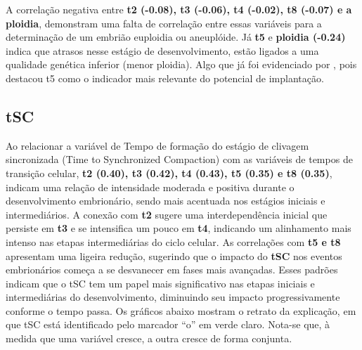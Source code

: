 A correlação negativa entre \textbf{t2 (-0.08), t3 (-0.06), t4 (-0.02), t8 (-0.07) e a ploidia}, demonstram uma falta de correlação entre essas variáveis para a determinação de um embrião euploidia ou aneuplóide. Já  \textbf{t5} e \textbf{ploidia (-0.24)} indica que atrasos nesse estágio de desenvolvimento, estão ligados a uma qualidade genética inferior (menor ploidia). Algo que já foi evidenciado por , pois destacou t5 como o indicador mais relevante do potencial de implantação. 

\subsection*{tSC}
Ao relacionar a variável de Tempo de formação do estágio de clivagem sincronizada (Time to Synchronized Compaction) com as variáveis de tempos de transição celular, \textbf{t2 (0.40), t3 (0.42), t4 (0.43), t5 (0.35) e t8 (0.35)}, indicam uma relação de intensidade moderada e positiva durante o desenvolvimento embrionário, sendo mais acentuada nos estágios iniciais e intermediários. A conexão com \textbf{t2} sugere uma interdependência inicial que persiste em \textbf{t3} e se intensifica um pouco em \textbf{t4}, indicando um alinhamento mais intenso nas etapas intermediárias do ciclo celular. As correlações com \textbf{t5 e t8} apresentam uma ligeira redução, sugerindo que o impacto do \textbf{tSC} nos eventos embrionários começa a se desvanecer em fases mais avançadas. Esses padrões indicam que o tSC tem um papel mais significativo nas etapas iniciais e intermediárias do desenvolvimento, diminuindo seu impacto progressivamente conforme o tempo passa. Os gráficos abaixo mostram o retrato da explicação, em que tSC está identificado pelo marcador “o” em verde claro. Nota-se que, à medida que uma variável cresce, a outra cresce de forma conjunta. 

